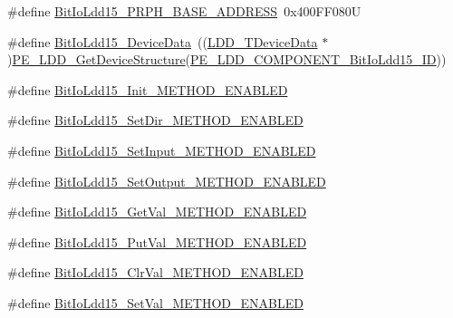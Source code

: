 \begin{DoxyCompactItemize}
\item 
\#define \hyperlink{group___bit_io_ldd15__module_ga2d00d02e3f5d2623adc748062013543c}{Bit\+Io\+Ldd15\+\_\+\+P\+R\+P\+H\+\_\+\+B\+A\+S\+E\+\_\+\+A\+D\+D\+R\+E\+SS}~0x400\+F\+F080U
\item 
\#define \hyperlink{group___bit_io_ldd15__module_ga7e053a3640af5a7522d2864dea4be75f}{Bit\+Io\+Ldd15\+\_\+\+Device\+Data}~((\hyperlink{group___p_e___types__module_gac5cf1362f1f0e3a2ce71b1bf2276d091}{L\+D\+D\+\_\+\+T\+Device\+Data} $\ast$)\hyperlink{group___p_e___types__module_gaa1c23d559daef5bcd3327ca83fb56f5a}{P\+E\+\_\+\+L\+D\+D\+\_\+\+Get\+Device\+Structure}(\hyperlink{group___p_e___types__module_ga4874ae66ec5915ca7e18b58a8177ab6c}{P\+E\+\_\+\+L\+D\+D\+\_\+\+C\+O\+M\+P\+O\+N\+E\+N\+T\+\_\+\+Bit\+Io\+Ldd15\+\_\+\+ID}))
\item 
\#define \hyperlink{group___bit_io_ldd15__module_ga5009de5631bf4920c9945cb9f43bc967}{Bit\+Io\+Ldd15\+\_\+\+Init\+\_\+\+M\+E\+T\+H\+O\+D\+\_\+\+E\+N\+A\+B\+L\+ED}
\item 
\#define \hyperlink{group___bit_io_ldd15__module_ga1a0f2e5c56a097b1f32085ec144739e4}{Bit\+Io\+Ldd15\+\_\+\+Set\+Dir\+\_\+\+M\+E\+T\+H\+O\+D\+\_\+\+E\+N\+A\+B\+L\+ED}
\item 
\#define \hyperlink{group___bit_io_ldd15__module_ga3d70d62d095acc7ac1de2661be126bac}{Bit\+Io\+Ldd15\+\_\+\+Set\+Input\+\_\+\+M\+E\+T\+H\+O\+D\+\_\+\+E\+N\+A\+B\+L\+ED}
\item 
\#define \hyperlink{group___bit_io_ldd15__module_gaf74cbe4412ba50ca5531fbad826b4c97}{Bit\+Io\+Ldd15\+\_\+\+Set\+Output\+\_\+\+M\+E\+T\+H\+O\+D\+\_\+\+E\+N\+A\+B\+L\+ED}
\item 
\#define \hyperlink{group___bit_io_ldd15__module_gada412e03041e18e145b88bc93c5c0916}{Bit\+Io\+Ldd15\+\_\+\+Get\+Val\+\_\+\+M\+E\+T\+H\+O\+D\+\_\+\+E\+N\+A\+B\+L\+ED}
\item 
\#define \hyperlink{group___bit_io_ldd15__module_ga92b5e7982380a58d9ac4438940582776}{Bit\+Io\+Ldd15\+\_\+\+Put\+Val\+\_\+\+M\+E\+T\+H\+O\+D\+\_\+\+E\+N\+A\+B\+L\+ED}
\item 
\#define \hyperlink{group___bit_io_ldd15__module_gaf5a424269d06c7e7afb305d5346467bf}{Bit\+Io\+Ldd15\+\_\+\+Clr\+Val\+\_\+\+M\+E\+T\+H\+O\+D\+\_\+\+E\+N\+A\+B\+L\+ED}
\item 
\#define \hyperlink{group___bit_io_ldd15__module_ga565ca8d7140d8ff7da084e70f7ff0f08}{Bit\+Io\+Ldd15\+\_\+\+Set\+Val\+\_\+\+M\+E\+T\+H\+O\+D\+\_\+\+E\+N\+A\+B\+L\+ED}
\item 

\end{DoxyCompactItemize}
